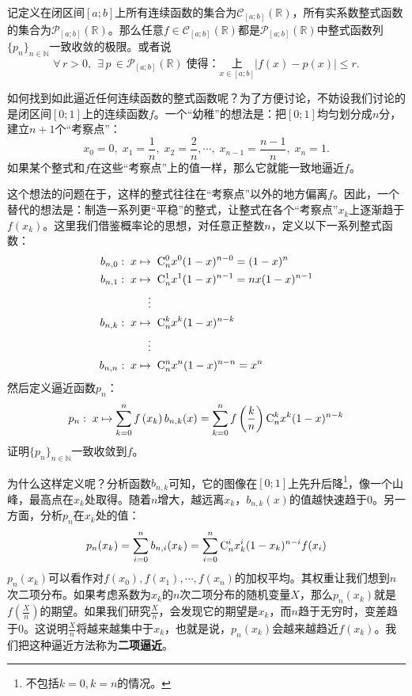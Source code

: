 \documentclass[12pt,UTF8]{ctexbook}
\begin{document}
\begin{tm}
    记定义在闭区间$[a;b]$上所有连续函数的集合为$\mathcal{C}_{[a;b]}(\mathbb{R})$，所有实系数整式函数的集合为$\mathcal{P}_{[a;b]}(\mathbb{R})$。那么任意$f\in\mathcal{C}_{[a;b]}(\mathbb{R})$都是$\mathcal{P}_{[a;b]}(\mathbb{R})$中整式函数列$\{p_n\}_{n\in\mathbb{N}}$一致收敛的极限。或者说
    $$ \forall \, r > 0, \;\, \exists \, p \, \in \mathcal{P}_{[a;b]}(\mathbb{R}) \; \mbox{使得：} \underset{x\in [a;b]}{\text{上}} \left| f(x) - p(x) \right| \leqslant r.$$
\end{tm}

如何找到如此逼近任何连续函数的整式函数呢？为了方便讨论，不妨设我们讨论的是闭区间$[0;1]$上的连续函数$f$。一个“幼稚”的想法是：把$[0;1]$均匀划分成$n$分，建立$n+1$个“考察点”：
$$ x_0 = 0, \; x_1 = \frac{1}{n}, \; x_2 = \frac{2}{n}, \cdots, \; x_{n-1} = \frac{n-1}{n}, \; x_{n} = 1. $$
如果某个整式和$f$在这些“考察点”上的值一样，那么它就能一致地逼近$f$。

这个想法的问题在于，这样的整式往往在“考察点”以外的地方偏离$f$。因此，一个替代的想法是：制造一系列更“平稳”的整式，让整式在各个“考察点”$x_k$上逐渐趋于$f(x_k)$。这里我们借鉴概率论的思想，对任意正整数$n$，定义以下一系列整式函数：
\begin{align*}
    b_{n,0}:\; x &\mapsto \;\mathrm{C}_{n}^{0} x^0(1 - x)^{n-0} = (1 - x)^{n} \\
    b_{n,1}:\; x &\mapsto \;\mathrm{C}_{n}^{1} x^1(1 - x)^{n-1} = nx(1 - x)^{n-1} \\
    &\quad \vdots \\
    b_{n,k}:\; x &\mapsto \;\mathrm{C}_{n}^{k} x^k(1 - x)^{n-k} \\
    &\quad \vdots \\
    b_{n,n}:\; x &\mapsto \;\mathrm{C}_{n}^{n} x^n(1 - x)^{n-n} = x^{n} 
\end{align*}
然后定义逼近函数$p_n$：
\begin{align*}
    p_n: \; x\mapsto \sum_{k=0}^n f\left(x_k\right) b_{n,k}(x) = \sum_{k=0}^n f\left(\frac{k}{n}\right) \mathrm{C}_{n}^{k} x^k(1 - x)^{n-k}
\end{align*}
证明$\{p_n\}_{n\in\mathbb{N}}$一致收敛到$f$。

为什么这样定义呢？分析函数$b_{n,k}$可知，它的图像在$[0;1]$上先升后降\footnote{不包括$k=0,k=n$的情况。}，像一个山峰，最高点在$x_k$处取得。随着$n$增大，越远离$x_k$，$b_{n,k}(x)$的值越快速趋于$0$。另一方面，分析$p_n$在$x_k$处的值：
\begin{align*}
    p_n(x_k) = \sum_{i=0}^n b_{n,i}(x_k) = \sum_{i=0}^n \mathrm{C}_{n}^{i} x_k^i(1 - x_k)^{n-i} f(x_i) 
\end{align*}
$p_n(x_k)$可以看作对$f(x_0), f(x_1), \cdots, f(x_n)$的加权平均。其权重让我们想到$n$次二项分布。如果考虑系数为$x_k$的$n$次二项分布的随机变量$X$，那么$p_n(x_k)$就是$\displaystyle f\left(\frac{X}{n}\right)$的期望。如果我们研究$\frac{X}{n}$，会发现它的期望是$x_k$，而$n$趋于无穷时，变差趋于$0$。这说明$\frac{X}{n}$将越来越集中于$x_k$，也就是说，$p_n(x_k)$会越来越趋近$f(x_k)$。我们把这种逼近方法称为\textbf{二项逼近}。
\end{document}
